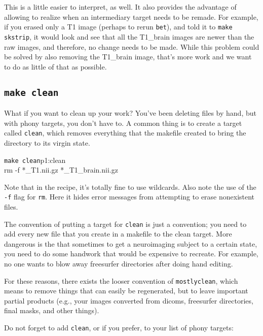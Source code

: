 This is a little easier to interpret, as well. It also provides the advantage of allowing \maken{} to realize when an intermediary target needs to be remade. For example, if you erased only a T1 image (perhaps to rerun \texttt{bet}), and told it to \texttt{make skstrip}, it would look and see that all the T1_brain images are newer than the raw images, and therefore, no change needs to be made. While this problem could be solved by also removing the T1_brain image, that's more work and we want to do as little of that as possible.

\subsection{\texttt{make clean}}

What if you want to clean up your work? You've been deleting files by hand, but with phony targets, you don't have to. A common thing is to create a target called \texttt{clean}, which removes everything that the makefile created to bring the directory to its virgin state.

\begin{make}{\texttt{make clean}}{p1:clean}
	\\
	\tab rm -f *_T1.nii.gz *_T1_brain.nii.gz
\end{make}

Note that in the recipe, it's totally fine to use wildcards. Also note the use of the \texttt{-f} flag for \texttt{rm}. Here it hides error messages from attempting to erase nonexistent files. 

The convention of putting a target for \texttt{clean} is just a convention; you need to add every new file that you create in a makefile to the clean target. More dangerous is the that sometimes to get a neuroimaging subject to a certain state, you need to do some handwork that would be expensive to recreate. For example, no one wants to blow away freesurfer directories after doing hand editing. 

For these reasons, there exists the looser convention of \texttt{mostlyclean}, which means to remove things that can easily be regenerated, but to leave important partial products (e.g., your images converted from dicoms, freesurfer directories, final masks, and other things).

Do not forget to add \texttt{clean}, or  if you prefer, to your list of phony targets:
